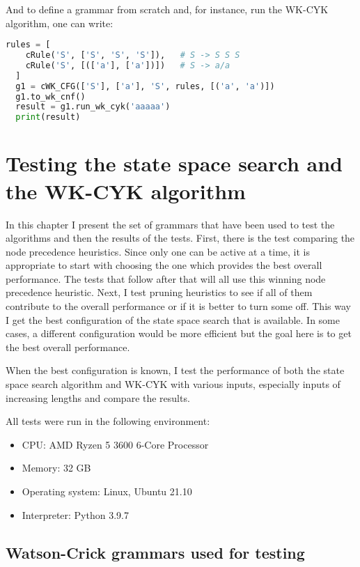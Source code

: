And to define a grammar from scratch and, for instance, run the WK-CYK algorithm, one can write:
\begin{lstlisting}[language=Python]
  rules = [
    cRule('S', ['S', 'S', 'S']),   # S -> S S S
    cRule('S', [(['a'], ['a'])])   # S -> a/a
  ]
  g1 = cWK_CFG(['S'], ['a'], 'S', rules, [('a', 'a')])
  g1.to_wk_cnf()
  result = g1.run_wk_cyk('aaaaa')
  print(result)
\end{lstlisting}


\chapter{Testing the state space search and the WK-CYK algorithm} \label{chapter:testing}

In this chapter I present the set of grammars that have been used to test the algorithms and then the results of the tests. First, there is the test comparing the node precedence heuristics. Since only one can be active at a time, it is appropriate to start with choosing the one which provides the best overall performance. The tests that follow after that will all use this winning node precedence heuristic. Next, I test pruning heuristics to see if all of them contribute to the overall performance or if it is better to turn some off. This way I get the best configuration of the state space search that is available. In some cases, a different configuration would be more efficient but the goal here is to get the best overall performance.

When the best configuration is known, I test the performance of both the state space search algorithm and WK-CYK with various inputs, especially inputs of increasing lengths and compare the results.

\bigskip

All tests were run in the following environment:
 \begin{itemize}
   \item{CPU: AMD Ryzen 5 3600 6-Core Processor}
   \item{Memory: 32 GB}
   \item{Operating system: Linux, Ubuntu 21.10}
   \item{Interpreter: Python 3.9.7}
 \end{itemize}

\section{Watson-Crick grammars used for testing}


